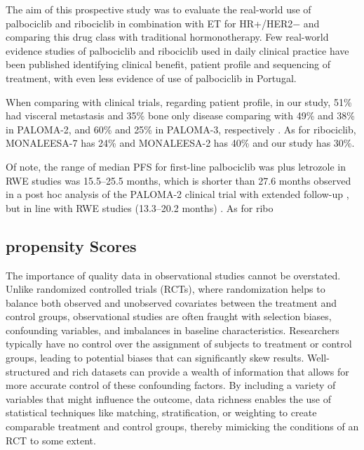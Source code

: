 The aim of this prospective study was to evaluate the real-world use of palbociclib and ribociclib in combination with ET for HR+/HER2$-$ and comparing this drug class with traditional hormonotherapy. Few real-world evidence studies of palbociclib and ribociclib used in daily clinical practice have been published identifying clinical benefit, patient profile and sequencing of treatment, with even less evidence of use of palbociclib in Portugal.

When comparing with clinical trials, regarding patient profile, in our study, 51\% had visceral metastasis and 35\% bone only disease comparing with 49\% and 38\% in PALOMA-2, and 60\% and 25\% in PALOMA-3, respectively \cite{rugoImpactPalbociclibLetrozole2018,cristofanilliFulvestrantPalbociclibFulvestrant2016a}.
As for ribociclib, MONALEESA-7 \cite{tripathyRibociclibEndocrineTherapy2018} has 24\% and MONALEESA-2 has 40\% \cite{hortobagyiUpdatedResultsMONALEESA22018} and our study has 30\%.



Of note, the range of median PFS for first-line palbociclib was plus letrozole in RWE studies was 15.5–25.5 months, which is shorter than 27.6 months observed in a post hoc analysis of the PALOMA-2 clinical trial with extended follow-up \cite{rugoImpactPalbociclibLetrozole2018}, but in line with RWE studies (13.3–20.2 months) \cite{harbeckCDK4InhibitorsHR2021}.
As for ribo


\subsection{propensity Scores}

The importance of quality data in observational studies cannot be overstated. Unlike randomized controlled trials (RCTs), where randomization helps to balance both observed and unobserved covariates between the treatment and control groups, observational studies are often fraught with selection biases, confounding variables, and imbalances in baseline characteristics. Researchers typically have no control over the assignment of subjects to treatment or control groups, leading to potential biases that can significantly skew results. Well-structured and rich datasets can provide a wealth of information that allows for more accurate control of these confounding factors. By including a variety of variables that might influence the outcome, data richness enables the use of statistical techniques like matching, stratification, or weighting to create comparable treatment and control groups, thereby mimicking the conditions of an RCT to some extent.


